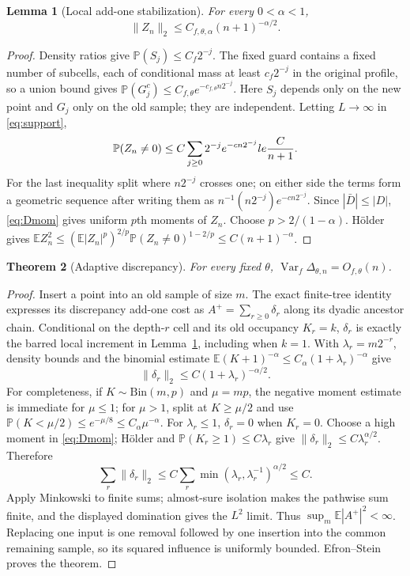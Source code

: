 \documentclass[11pt]{article}
\numberwithin{equation}{section}
\newtheorem{theorem}{Theorem}[section]
\newtheorem{lemma}[theorem]{Lemma}
\newcommand{\E}{\mathbb E}\newcommand{\Pp}{\mathbb P}
\newcommand{\Var}{\operatorname{Var}}\newcommand{\Cov}{\operatorname{Cov}}
\newcommand{\1}{\mathbf 1}\newcommand{\F}{\mathcal F}\newcommand{\D}{\mathcal D}
\newcommand{\norm}[1]{\lVert#1\rVert}
\begin{document}
\begin{lemma}[Local add-one stabilization]\label{lem:localstab}
For every $0<\alpha<1$,
\begin{equation}\label{eq:localstab}
 \norm{Z_n}_2\le C_{f,\theta,\alpha}(n+1)^{-\alpha/2}.
\end{equation}
\end{lemma}
\begin{proof}
Density ratios give $\Pp(S_j)\le C_f2^{-j}$.  The fixed guard contains a
fixed number of subcells, each of conditional mass at least $c_f2^{-j}$ in
the original profile, so a union bound gives
$\Pp(G_j^c)\le C_{f,\theta}e^{-c_{f,\theta}n2^{-j}}$.
Here $S_j$ depends only on the new point and $G_j$ only on the old sample;
they are independent.  Letting $L\to\infty$ in \eqref{eq:support},
\[
 \Pp(Z_n\ne0)\le C\sum_{j\ge0}2^{-j}e^{-cn2^{-j}}le {C\over n+1}.
\]
For the last inequality split where $n2^{-j}$ crosses one; on either side
the terms form a geometric sequence after writing them as
$n^{-1}(n2^{-j})e^{-cn2^{-j}}$.  Since $|\bar D|\le|D|$, \eqref{eq:Dmom} gives uniform $p$th moments
of $Z_n$.  Choose $p>2/(1-\alpha)$.  H\"older gives
$\E Z_n^2\le(\E|Z_n|^p)^{2/p}\Pp(Z_n\ne0)^{1-2/p}
\le C(n+1)^{-\alpha}$.
\end{proof}

\begin{theorem}[Adaptive discrepancy]\label{thm:delta}
For every fixed $\theta$, $\Var_f\Delta_{\theta,n}=O_{f,\theta}(n)$.
\end{theorem}
\begin{proof}
Insert a point into an old sample of size $m$.  The exact finite-tree identity
expresses its discrepancy add-one cost as
$A^+=\sum_{r\ge0}\delta_r$ along its dyadic ancestor chain.  Conditional on the depth-$r$ cell and its old occupancy $K_r=k$,
$\delta_r$ is exactly the barred local increment in
Lemma~\ref{lem:localstab}, including when $k=1$.  With
$\lambda_r=m2^{-r}$, density bounds and the binomial estimate
$\E(K+1)^{-\alpha}\le C_\alpha(1+\lambda_r)^{-\alpha}$ give
\[
 \norm{\delta_r}_2\le C(1+\lambda_r)^{-\alpha/2}.
\]
For completeness, if $K\sim\mathrm{Bin}(m,p)$ and $\mu=mp$, the negative
moment estimate is immediate for $\mu\le1$; for $\mu>1$, split at
$K\ge\mu/2$ and use
$\Pp(K<\mu/2)\le e^{-\mu/8}\le C_\alpha\mu^{-\alpha}$.
For $\lambda_r\le1$, $\delta_r=0$ when $K_r=0$.  Choose a high moment in
\eqref{eq:Dmom}; H\"older and $\Pp(K_r\ge1)\le C\lambda_r$ give
$\norm{\delta_r}_2\le C\lambda_r^{\alpha/2}$.  Therefore
\[
 \sum_r\norm{\delta_r}_2\le C\sum_r
 \min(\lambda_r,\lambda_r^{-1})^{\alpha/2}\le C.
\]
Apply Minkowski to finite sums; almost-sure isolation makes the pathwise sum
finite, and the displayed domination gives the $L^2$ limit.  Thus
$\sup_m\E|A^+|^2<\infty$.  Replacing one input is one removal followed by
one insertion into the common remaining sample, so its squared influence is
uniformly bounded.  Efron--Stein proves the theorem.
\end{proof}
\end{document}
